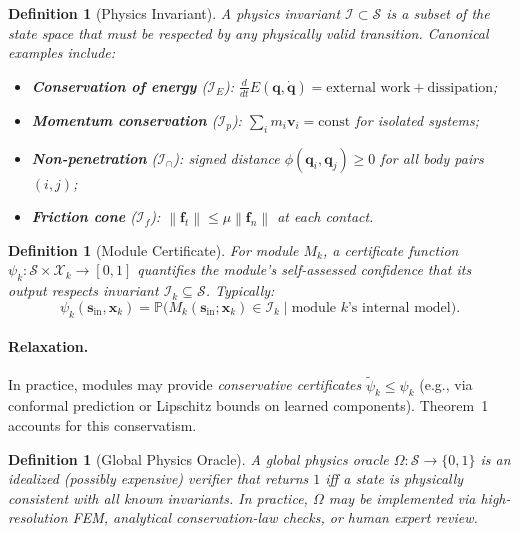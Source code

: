 \documentclass[11pt,twocolumn]{article}
\newtheorem{definition}[theorem]{Definition}
\theoremstyle{definition}
\newcommand{\Pbb}{\mathbb{P}}
\newcommand{\cS}{\mathcal{S}}
\newcommand{\cX}{\mathcal{X}}
\newcommand{\norm}[1]{\left\lVert#1\right\rVert}
\begin{document}
\begin{definition}[Physics Invariant]
\label{def:invariant}
A \emph{physics invariant} $\mathcal{I} \subset \cS$ is a subset of the state
space that must be respected by any physically valid transition.  Canonical
examples include:
\begin{itemize}[nosep]
  \item \textbf{Conservation of energy} ($\mathcal{I}_E$):
    $\frac{d}{dt}E(\mathbf{q},\dot{\mathbf{q}}) = \text{external work} + \text{dissipation}$;
  \item \textbf{Momentum conservation} ($\mathcal{I}_p$): $\sum_i m_i \mathbf{v}_i = \text{const}$ for isolated systems;
  \item \textbf{Non-penetration} ($\mathcal{I}_{\cap}$): signed distance $\phi(\mathbf{q}_i, \mathbf{q}_j) \ge 0$ for all body pairs $(i,j)$;
  \item \textbf{Friction cone} ($\mathcal{I}_f$): $\norm{\mathbf{f}_t} \le \mu \norm{\mathbf{f}_n}$ at each contact.
\end{itemize}
\end{definition}

\begin{definition}[Module Certificate]
\label{def:certificate}
For module $M_k$, a \emph{certificate function} $\psi_k: \cS \times \cX_k \to
[0,1]$ quantifies the module's \emph{self-assessed} confidence that its output
respects invariant $\mathcal{I}_k \subseteq \cS$.  Typically:
\begin{equation}\label{eq:cert}
  \psi_k(\mathbf{s}_{\text{in}}, \mathbf{x}_k) =
  \Pbb\bigl(M_k(\mathbf{s}_{\text{in}}; \mathbf{x}_k) \in \mathcal{I}_k
  \;\big|\; \text{module } k \text{'s internal model}\bigr).
\end{equation}
\end{definition}

\paragraph{Relaxation.}
In practice, modules may provide \emph{conservative certificates}
$\tilde{\psi}_k \le \psi_k$ (e.g., via conformal prediction or Lipschitz
bounds on learned components).  Theorem~1 accounts for this conservatism.

\begin{definition}[Global Physics Oracle]
\label{def:oracle}
A \emph{global physics oracle} $\Omega: \cS \to \{0,1\}$ is an idealized
(possibly expensive) verifier that returns $1$ iff a state is physically
consistent with all known invariants.  In practice, $\Omega$ may be
implemented via high-resolution FEM, analytical conservation-law checks, or
human expert review.
\end{definition}
\end{document}
